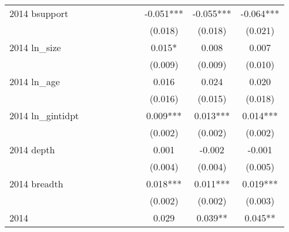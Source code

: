 \begin{table}[htbp]
\begin{tabular}{l*{9}{c}}
2014 bsupport       &               &               &               &               &               &               &      -0.051***&      -0.055***&      -0.064***\\
                    &               &               &               &               &               &               &     (0.018)   &     (0.018)   &     (0.021)   \\
2014 ln\_size        &               &               &               &               &               &               &       0.015*  &       0.008   &       0.007   \\
                    &               &               &               &               &               &               &     (0.009)   &     (0.009)   &     (0.010)   \\
2014 ln\_age         &               &               &               &               &               &               &       0.016   &       0.024   &       0.020   \\
                    &               &               &               &               &               &               &     (0.016)   &     (0.015)   &     (0.018)   \\
2014 ln\_gintidpt    &               &               &               &               &               &               &       0.009***&       0.013***&       0.014***\\
                    &               &               &               &               &               &               &     (0.002)   &     (0.002)   &     (0.002)   \\
2014 depth          &               &               &               &               &               &               &       0.001   &      -0.002   &      -0.001   \\
                    &               &               &               &               &               &               &     (0.004)   &     (0.004)   &     (0.005)   \\
2014 breadth        &               &               &               &               &               &               &       0.018***&       0.011***&       0.019***\\
                    &               &               &               &               &               &               &     (0.002)   &     (0.002)   &     (0.003)   \\
2014                &               &               &               &               &               &               &       0.029   &       0.039** &       0.045** \\

\end{tabular}
\end{table}
